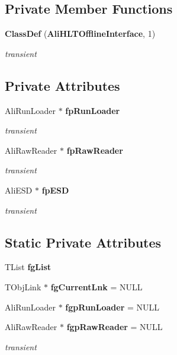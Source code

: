 \subsection*{Private Member Functions}
\begin{CompactItemize}
\item 
{\bf Class\-Def} ({\bf Ali\-HLTOffline\-Interface}, 1)
\begin{CompactList}\small\item\em transient \item\end{CompactList}\end{CompactItemize}
\subsection*{Private Attributes}
\begin{CompactItemize}
\item 
Ali\-Run\-Loader $\ast$ {\bf fp\-Run\-Loader}
\begin{CompactList}\small\item\em transient \item\end{CompactList}\item 
Ali\-Raw\-Reader $\ast$ {\bf fp\-Raw\-Reader}
\begin{CompactList}\small\item\em transient \item\end{CompactList}\item 
Ali\-ESD $\ast$ {\bf fp\-ESD}
\begin{CompactList}\small\item\em transient \item\end{CompactList}\end{CompactItemize}
\subsection*{Static Private Attributes}
\begin{CompactItemize}
\item 
TList {\bf fg\-List}
\item 
TObj\-Link $\ast$ {\bf fg\-Current\-Lnk} = NULL
\item 
Ali\-Run\-Loader $\ast$ {\bf fgp\-Run\-Loader} = NULL
\item 
Ali\-Raw\-Reader $\ast$ {\bf fgp\-Raw\-Reader} = NULL
\begin{CompactList}\small\item\em transient \item\end{CompactList}\end{CompactItemize}


